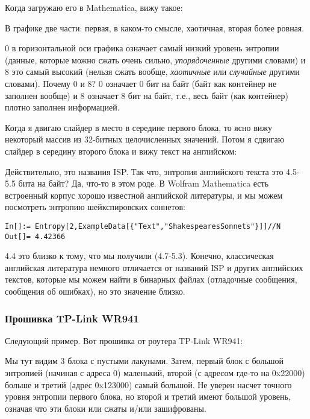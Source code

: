 Когда загружаю его в Mathematica, вижу такое:



В графике две части: первая, в каком-то смысле, хаотичная, вторая более ровная.

0 в горизонтальной оси графика означает самый низкий уровень энтропии
(данные, которые можно сжать очень сильно, \emph{упорядоченные} другими словами) 
и 8 это самый высокий (нельзя сжать вообще, \emph{хаотичные} или \emph{случайные} другими словами).
Почему 0 и 8? 0 означает 0 бит на байт (байт как контейнер не заполнен вообще) 
и 8 означает 8 бит на байт, т.е., весь байт (как контейнер) плотно заполнен информацией.

Когда я двигаю слайдер в место в середине первого блока, то ясно вижу некоторый массив из 32-битных целочисленных значений.
Потом я сдвигаю слайдер в середину второго блока и вижу текст на английском:



Действительно, это названия ISP.
Так что, энтропия английского текста это 4.5-5.5 бита на байт? Да, что-то в этом роде.
В Wolfram Mathematica есть встроенный корпус хорошо известной английской литературы, и мы можем посмотреть энтропию
шейкспировских соннетов:

\begin{lstlisting}[style=custommath]
In[]:= Entropy[2,ExampleData[{"Text","ShakespearesSonnets"}]]//N
Out[]= 4.42366
\end{lstlisting}

4.4 это близко к тому, что мы получили (4.7-5.3). 
Конечно, классическая английская литература немного отличается от названий ISP и других английских текстов, которые мы
можем найти в бинарных файлах (отладочные сообщения, сообщения об ошибках), но это значение близко.

\subsubsection{Прошивка TP-Link WR941}

Следующий пример. Вот прошивка от роутера TP-Link WR941:



Мы тут видим 3 блока с пустыми лакунами.
Затем, первый блок с большой энтропией (начиная с адреса 0) маленький,
второй (с адресом где-то на 0x22000) больше и третий (адрес 0x123000) самый
большой.
Не уверен насчет точного уровня энтропии первого блока, но второй и третий имеют большой уровень, означая что эти блоки
или сжаты и/или зашифрованы.

